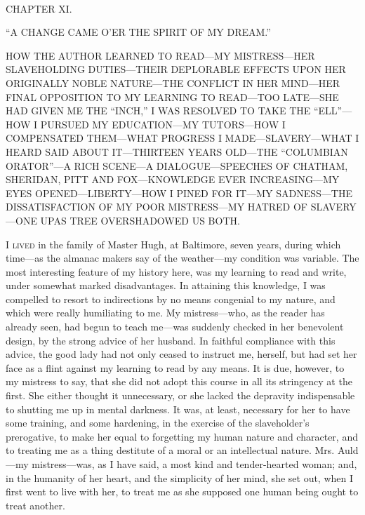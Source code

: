 {}

~

{CHAPTER XI.}

``A CHANGE CAME O'ER THE SPIRIT OF MY DREAM.''

{HOW THE AUTHOR LEARNED TO READ---MY MISTRESS---HER SLAVEHOLDING
DUTIES---THEIR DEPLORABLE EFFECTS UPON HER ORIGINALLY NOBLE NATURE---THE
CONFLICT IN HER MIND---HER FINAL OPPOSITION TO MY LEARNING TO READ---TOO
LATE---SHE HAD GIVEN ME THE ``INCH,'' I WAS RESOLVED TO TAKE THE
``ELL''---HOW I PURSUED MY EDUCATION---MY TUTORS---HOW I COMPENSATED
THEM---WHAT PROGRESS I MADE---SLAVERY---WHAT I HEARD SAID ABOUT
IT---THIRTEEN YEARS OLD---THE ``COLUMBIAN ORATOR''---A RICH SCENE---A
DIALOGUE---SPEECHES OF CHATHAM, SHERIDAN, PITT AND FOX---KNOWLEDGE EVER
INCREASING---MY EYES OPENED---LIBERTY---HOW I PINED FOR IT---MY
SADNESS---THE DISSATISFACTION OF MY POOR MISTRESS---MY HATRED OF
SLAVERY---ONE UPAS TREE OVERSHADOWED US BOTH.}

\textsc{I lived} in the family of Master Hugh, at Baltimore, seven
years, during which time---as the almanac makers say of the weather---my
condition was variable. The most interesting feature of my history here,
was my learning to read and write, under somewhat marked disadvantages.
In attaining this knowledge, I was compelled to resort to indirections
by no means congenial to my nature, and which were really humiliating to
me. My mistress---who, as the reader has already seen, had begun to
teach me---was suddenly checked in her benevolent design, by the strong
advice of her husband. In faithful compliance with this advice, the good
lady had not only ceased to instruct me, herself, but had set her face
as a flint against my learning to read by any means. It is due,
{}however, to my mistress to say, that she did not adopt this course in
all its stringency at the first. She either thought it unnecessary, or
she lacked the depravity indispensable to shutting me up in mental
darkness. It was, at least, necessary for her to have some training, and
some hardening, in the exercise of the slaveholder's prerogative, to
make her equal to forgetting my human nature and character, and to
treating me as a thing destitute of a moral or an intellectual nature.
Mrs. Auld---my mistress---was, as I have said, a most kind and
tender-hearted woman; and, in the humanity of her heart, and the
simplicity of her mind, she set out, when I first went to live with her,
to treat me as she supposed one human being ought to treat another.


